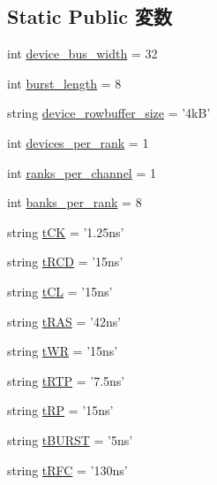 \subsection*{Static Public 変数}
\begin{DoxyCompactItemize}
\item 
int \hyperlink{classDRAMCtrl_1_1LPDDR3__1600__x32_ac980afb64b962aec673eeadb21ea8b0e}{device\_\-bus\_\-width} = 32
\item 
int \hyperlink{classDRAMCtrl_1_1LPDDR3__1600__x32_afeba385888f1ce3063d25f20c0e7a89b}{burst\_\-length} = 8
\item 
string \hyperlink{classDRAMCtrl_1_1LPDDR3__1600__x32_ab24d9a52c5c94331e40478cc93e9abe1}{device\_\-rowbuffer\_\-size} = '4kB'
\item 
int \hyperlink{classDRAMCtrl_1_1LPDDR3__1600__x32_a60039c77757fd0118d81754311d71cfb}{devices\_\-per\_\-rank} = 1
\item 
int \hyperlink{classDRAMCtrl_1_1LPDDR3__1600__x32_ab610af52b1f27db17e9de304176a80a8}{ranks\_\-per\_\-channel} = 1
\item 
int \hyperlink{classDRAMCtrl_1_1LPDDR3__1600__x32_ac43360fda587200e99a090d69163e089}{banks\_\-per\_\-rank} = 8
\item 
string \hyperlink{classDRAMCtrl_1_1LPDDR3__1600__x32_a78016df5bd6c91551bcf487d3d665ebe}{tCK} = '1.25ns'
\item 
string \hyperlink{classDRAMCtrl_1_1LPDDR3__1600__x32_a31691ebf1f58ff89b00f261f5adea8e2}{tRCD} = '15ns'
\item 
string \hyperlink{classDRAMCtrl_1_1LPDDR3__1600__x32_a009c2614e5d317cb4805a4a98ace1b19}{tCL} = '15ns'
\item 
string \hyperlink{classDRAMCtrl_1_1LPDDR3__1600__x32_a1b5f15dad9d492ce5d0167e1581de8cc}{tRAS} = '42ns'
\item 
string \hyperlink{classDRAMCtrl_1_1LPDDR3__1600__x32_a9d8360f5123eaf9b5b6013adca83d1ae}{tWR} = '15ns'
\item 
string \hyperlink{classDRAMCtrl_1_1LPDDR3__1600__x32_ac0793c2fe127d7331efb7012e82dae77}{tRTP} = '7.5ns'
\item 
string \hyperlink{classDRAMCtrl_1_1LPDDR3__1600__x32_aeda425967c3cf2880bdc1640e9733439}{tRP} = '15ns'
\item 
string \hyperlink{classDRAMCtrl_1_1LPDDR3__1600__x32_af962cc8ff13de9c28027368562b67c1e}{tBURST} = '5ns'
\item 
string \hyperlink{classDRAMCtrl_1_1LPDDR3__1600__x32_a05307f048be759575436bb4a58206f04}{tRFC} = '130ns'
\item 

\end{DoxyCompactItemize}
